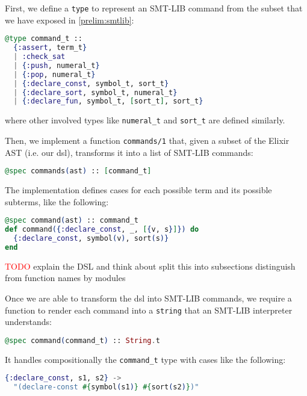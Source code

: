 First, we define a \verb|type| to represent an SMT-LIB command from the subset
that we have exposed in \ref{prelim:smtlib}:

\begin{lstlisting}[language=elixir,numbers=none,frame=none]
@type command_t ::
  {:assert, term_t}
  | :check_sat
  | {:push, numeral_t}
  | {:pop, numeral_t}
  | {:declare_const, symbol_t, sort_t}
  | {:declare_sort, symbol_t, numeral_t}
  | {:declare_fun, symbol_t, [sort_t], sort_t}
\end{lstlisting}

where other involved types like \verb|numeral_t| and \verb|sort_t| are defined 
similarly.

Then, we implement a function \verb|commands/1| that, given a subset of the 
Elixir AST (i.e. our \gls{dsl}), transforms it into a list of SMT-LIB commands:

\begin{lstlisting}[language=elixir,numbers=none,frame=none]
@spec commands(ast) :: [command_t]
\end{lstlisting}
  
The implementation defines cases for each possible term and its possible
subterms, like the following:

\begin{lstlisting}[language=elixir,numbers=none,frame=none]
@spec command(ast) :: command_t
def command({:declare_const, _, [{v, s}]}) do
  {:declare_const, symbol(v), sort(s)}
end
\end{lstlisting}

\textcolor{red}{TODO} explain the DSL and think about split this into subsections
distinguish from function names by modules

Once we are able to transform the \gls{dsl} into SMT-LIB commands, we require 
a function to render each command into a \verb|string| that an SMT-LIB
interpreter understands:

\begin{lstlisting}[language=elixir,numbers=none,frame=none]
@spec command(command_t) :: String.t
\end{lstlisting}

It handles compositionally the \verb|command_t| type with cases like the
following:

\begin{lstlisting}[language=elixir,numbers=none,frame=none]
{:declare_const, s1, s2} ->
  "(declare-const #{symbol(s1)} #{sort(s2)})"
\end{lstlisting}

